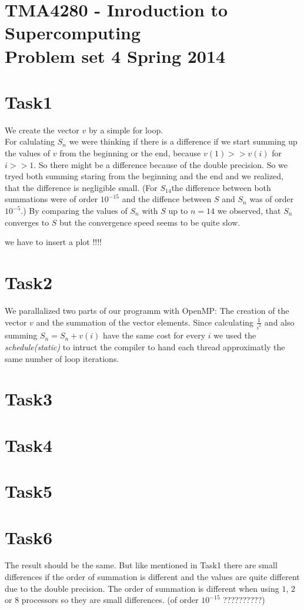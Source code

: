 \documentclass[11pt,titlepage] {article}
\begin{document}
 
\section*{TMA4280 - Inroduction to Supercomputing\\ Problem set 4  Spring 2014}


\section{Task1}
We create the vector $v$ by a simple for loop. \\
For calulating $S_n$ we were thinking if there is a difference if we start summing up the values of $v$ from the beginning or the end, because $v(1)>>v(i)$ for $i>>1$. So there might be a difference because of the double precision. So we tryed both summing staring from the beginning and the end and we realized, that the difference is negligible small. (For $S_{14}$the difference between both summations were of order $10^{-15}$ and the diffence between $S$ and $S_n$ was of order $10^{-5}$.)
By comparing the values of $S_n$ with $S$ up to $n=14$ we observed, that $S_n$ converges to $S$ but the convergence speed seems to be quite slow.

we have to insert a plot !!!! 

\section{Task2}
 We parallalized two parts of our programm with OpenMP: The creation of the vector $v$ and the summation of the vector elements. Since calculating $\frac{1}{i^2}$ and also summing $S_n=S_n+v(i)$ 
have the same cost for every $i$ we used the \textit{schedule(static)} to intruct the compiler to hand each thread approximatly the same number of loop iterations.

\section{Task3}

\section{Task4}

\section{Task5}


\section{Task6}
The result should be the same. But like mentioned in Task1 there are small differences if the order of summation is different and the values are quite different due to the double precision. The order of summation is different when using $1$, $2$ or $8$ processors so they are small differences. (of order  $10^{-15}$   ??????????)
\end{document}
